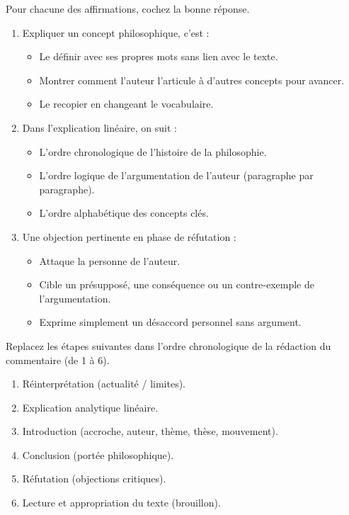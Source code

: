 \documentclass[11pt]{article}
\begin{document}
\begin{exercice}
Pour chacune des affirmations, cochez la bonne réponse.
\begin{enumerate}
    \item Expliquer un concept philosophique, c'est :
    \begin{itemize}
        \item[a)] Le définir avec ses propres mots sans lien avec le texte.
        \item[b)] Montrer comment l'auteur l'articule à d'autres concepts pour avancer.
        \item[c)] Le recopier en changeant le vocabulaire.
    \end{itemize}
    \item Dans l'explication linéaire, on suit :
    \begin{itemize}
        \item[a)] L'ordre chronologique de l'histoire de la philosophie.
        \item[b)] L'ordre logique de l'argumentation de l'auteur (paragraphe par paragraphe).
        \item[c)] L'ordre alphabétique des concepts clés.
    \end{itemize}
    \item Une objection pertinente en phase de réfutation :
    \begin{itemize}
        \item[a)] Attaque la personne de l'auteur.
        \item[b)] Cible un présupposé, une conséquence ou un contre-exemple de l'argumentation.
        \item[c)] Exprime simplement un désaccord personnel sans argument.
    \end{itemize}
\end{enumerate}
\end{exercice}

\begin{exercice}
Replacez les étapes suivantes dans l'ordre chronologique de la rédaction du commentaire (de 1 à 6).
\begin{enumerate}
    \item Réinterprétation (actualité / limites).
    \item Explication analytique linéaire.
    \item Introduction (accroche, auteur, thème, thèse, mouvement).
    \item Conclusion (portée philosophique).
    \item Réfutation (objections critiques).
    \item Lecture et appropriation du texte (brouillon).
\end{enumerate}
\end{exercice}
\end{document}
